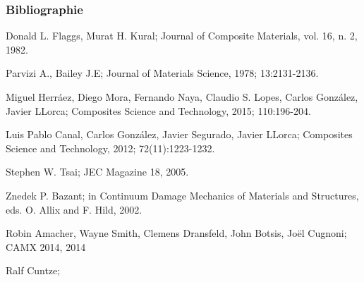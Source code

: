 \documentclass[first,firstsupp,lastsupp,handout,last,hyperref,table]{ETHclass}
\begin{document}
\begin{frame}[allowframebreaks]
  \frametitle{Bibliographie}
    
  \begin{thebibliography}{10}
    
%
 
    
  \beamertemplatearticlebibitems

Donald L. Flaggs, Murat H. Kural;
\newblock Journal of Composite Materials, vol. 16, n. 2, 1982.

Parvizi A., Bailey J.E;
\newblock Journal of Materials Science, 1978; 13:2131-2136.

Miguel Herr\'aez, Diego Mora, Fernando Naya, Claudio S. Lopes, Carlos Gonz\'alez, Javier LLorca;
\newblock Composites Science and Technology, 2015; 110:196-204.

Luis Pablo Canal, Carlos Gonz\'alez, Javier Segurado, Javier LLorca;
\newblock Composites Science and Technology, 2012; 72(11):1223-1232.

Stephen W. Tsai;
\newblock JEC Magazine 18, 2005.


Znedek P. Bazant;
\newblock in Continuum Damage Mechanics of Materials and Structures, eds. O. Allix and F. Hild, 2002.


Robin Amacher, Wayne Smith, Clemens Dransfeld, John Botsis, Jo\"el Cugnoni;
\newblock CAMX 2014, 2014

Ralf Cuntze;



\end{thebibliography}
\end{frame}
\end{document}
